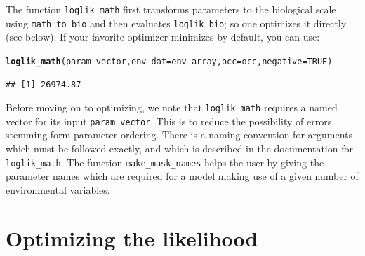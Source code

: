 \documentclass[11pt]{article}\usepackage[]{graphicx}\usepackage[]{xcolor}
\makeatletter
\newcommand{\hlnum}[1]{\textcolor[rgb]{0.686,0.059,0.569}{#1}}%
\newcommand{\hldef}[1]{\textcolor[rgb]{0.345,0.345,0.345}{#1}}%
\newcommand{\hlkwc}[1]{\textcolor[rgb]{0.333,0.667,0.333}{#1}}%
\newcommand{\hlkwd}[1]{\textcolor[rgb]{0.737,0.353,0.396}{\textbf{#1}}}%
\newenvironment{kframe}{%
 \def\at@end@of@kframe{}%
 \ifinner\ifhmode%
  \def\at@end@of@kframe{\end{minipage}}%
  \begin{minipage}{\columnwidth}%
 \fi\fi%
 \def\FrameCommand##1{\hskip\@totalleftmargin \hskip-\fboxsep
 \colorbox{shadecolor}{##1}\hskip-\fboxsep
     \hskip-\linewidth \hskip-\@totalleftmargin \hskip\columnwidth}%
 \MakeFramed {\advance\hsize-\width
   \@totalleftmargin\z@ \linewidth\hsize
   \@setminipage}}%
 {\par\unskip\endMakeFramed%
 \at@end@of@kframe}
\newenvironment{knitrout}{}{} %
\makeatother
\begin{document}
\noindent The function \texttt{loglik\_math} first transforms parameters to the 
biological scale using \texttt{math\_to\_bio} and
then evaluates \texttt{loglik\_bio}; so one optimizes it directly 
(see below). If your favorite optimizer minimizes by default, you can use:
\begin{knitrout}
\color{fgcolor}\begin{kframe}
\begin{alltt}
\hlkwd{loglik_math}\hldef{(param_vector,} \hlkwc{env_dat} \hldef{= env_array,} \hlkwc{occ} \hldef{= occ,} \hlkwc{negative} \hldef{=} \hlnum{TRUE}\hldef{)}
\end{alltt}
\begin{verbatim}
## [1] 26974.87
\end{verbatim}
\end{kframe}
\end{knitrout}
\noindent Before moving on to optimizing, we note that \texttt{loglik\_math}
requires a named vector for its input \texttt{param\_vector}. This is to reduce
the possibility of errors stemming form parameter ordering. There is a 
naming convention for arguments which must be followed exactly, and which is described 
in the documentation for \texttt{loglik\_math}. 
The function \texttt{make\_mask\_names} helps the user by giving the parameter names which
are required for a model making use of a given number of environmental variables.

\section{Optimizing the likelihood}
\end{document}
